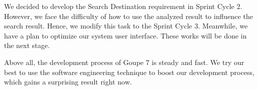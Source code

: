 \documentclass[conference]{IEEEtran}
\begin{document}
We decided to develop the Search Destination requirement in Sprint Cycle 2. However, we face the difficulty of how to use the analyzed result to influence the search result. Hence, we modify this task to the Sprint Cycle 3. Meanwhile, we have a plan to optimize our system user interface. These works will be done in the next stage.

Above all, the development process of Goupe 7 is steady and fast. We try our best to use the software engineering technique to boost our development process, which gains a surprising result right now.
\end{document}
